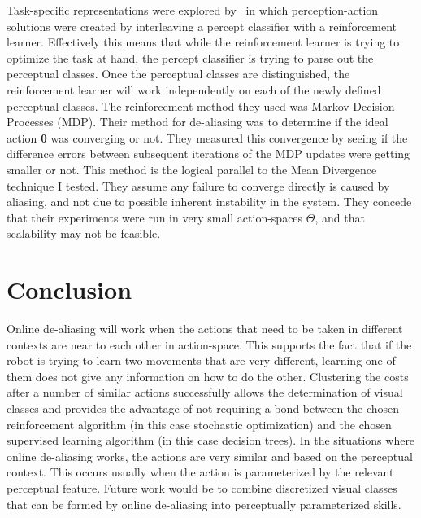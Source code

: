 \documentclass[12pt]{article}
\newcommand{\mymath}[1]{\ensuremath{#1}\xspace}
\newcommand{\app}    {\mymath{\bm{\theta}}}
\newcommand{\appsp}  {\mymath{\Theta}}
\begin{document}
Task-specific representations were explored by~\cite{piater11learning} in which perception-action solutions were created by interleaving a percept classifier with a reinforcement learner. Effectively this means that while the reinforcement learner is trying to optimize the task at hand, the percept classifier is trying to parse out the perceptual classes. Once the perceptual classes are distinguished, the reinforcement learner will work independently on each of the newly defined perceptual classes. The reinforcement method they used was Markov Decision Processes (MDP). Their method for de-aliasing was to determine if the ideal action $\app$ was converging or not. They measured this convergence by seeing if the difference errors between subsequent iterations of the MDP updates were getting smaller or not. This method is the logical parallel to the Mean Divergence technique I tested. They assume any failure to converge directly is caused by aliasing, and not due to possible inherent instability in the system. They concede that their experiments were run in very small action-spaces $\appsp$, and that scalability may not be feasible. 


\section{Conclusion}

Online de-aliasing will work when the actions that need to be taken in different contexts are near to each other in action-space. This supports the fact that if the robot is trying to learn two movements that are very different, learning one of them does not give any information on how to do the other. Clustering the costs after a number of similar actions successfully allows the determination of visual classes and provides the advantage of not requiring a bond between the chosen reinforcement algorithm (in this case stochastic optimization) and the chosen supervised learning algorithm (in this case decision trees). In the situations where online de-aliasing works, the actions are very similar and based on the perceptual context. This occurs usually when the action is parameterized by the relevant perceptual feature. Future work would be to combine discretized visual classes that can be formed by online de-aliasing into perceptually parameterized skills.

%


\end{document}
